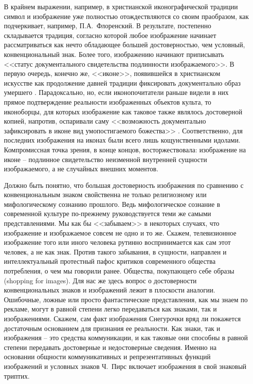 В крайнем выражении, например, в христианской иконографической традиции
символ и изображение уже полностью отождествляются со своим праобразом,
как подчеркивает, например, П.А.~Флоренский\autocite{florensky1995}.
В результате, постепенно складывается традиция, согласно которой любое
изображение начинает рассматриваться как нечто обладающее большей достоверностью,
чем условный, конвенциональный знак. Более того, изображению начинают
приписывать <<статус документального свидетельства подлинности изображаемого>>\autocite[][143]{chertov1993}. В первую очередь, конечно же, <<иконе>>, появившейся в
христианском искусстве как продолжение давней традиции фиксировать документально
образ умершего \autocite{lihachev1971}.
Парадоксально, но, если иконопочитатели раньше видели в них прямое подтверждение
реальности изображенных объектов культа, то иконоборцы, для которых изображение
как таковое также являлось достоверной копией, напротив,  оспаривали саму
<<возможность документально зафиксировать в иконе вид умопостигаемого божества>>
\autocite[][143]{chertov1993}. Соответственно, для последних изображения на иконах были
всего лишь кощунственными идолами. Компромиссная точка зрения, в конце
концов, восторжествовала: изображение на иконе -- подлинное свидетельство
неизменной внутренней сущности изображаемого, а не случайных внешних
моментов\autocite[][18]{lasarev1986, bichkov1989}.

Должно быть понятно, что большая достоверность изображения по сравнению с
конвенциональным знаком свойственна не только религиозному или
мифологическому сознанию прошлого. Ведь мифологическое сознание в современной
культуре по-прежнему руководствуется теми же самыми представлениями.
Мы как бы <<забываем>> в некоторых случаях, что изображение и изображаемое
совсем не одно и то же. Скажем,
телевизионное изображение того или иного человека рутинно воспринимается
как сам этот человек, а не как знак. Против такого забывания, в
сущности, направлен и интеллектуальный протестный пафос критиков современного
общества потребления, о чем мы говорили ранее. Общества, покупающего себе образы
(shopping for images)\autocite{ginsberg1984supermarket}. Для нас же здесь вопрос о
достоверности конвенциональных знаков и изображений лежит в плоскости аналогии.
Ошибочные, ложные или просто фантастические представления, как мы знаем по
рекламе, могут в равной степени легко передаваться как знаками, так и
изображениями. Скажем, сам факт изображения Снегурочки вряд ли покажется
достаточным основанием для признания ее реальности. Как знаки, так и
изображения -- это средства коммуникации, и как таковые они способны в равной
степени передавать достоверные и недостоверные сведения. Именно на основании
общности коммуникативных и репрезентативных функций изображений и условных знаков
Ч.~Пирс включает изображения в  свой знаковый триптих.

